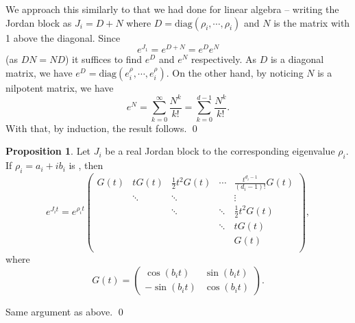 \documentclass[
]{article}
\theoremstyle{definition}
\newtheorem{prop}{Proposition}
\theoremstyle{definition}
\begin{document}
We approach this similarly to that we had done for linear algebra --
writing the Jordan block as \(J_i = D + N\) where
\(D = \text{diag}(\rho_i, \cdots, \rho_i)\) and \(N\) is the matrix with
1 above the diagonal. Since \[e^{J_1} = e^{D + N} = e^D e^N\] (as
\(DN = ND\)) it suffices to find \(e^D\) and \(e^N\) respectively. As
\(D\) is a diagonal matrix, we have
\(e^D = \text{diag}(e^\rho_i, \cdots, e^\rho_i)\). On the other hand, by
noticing \(N\) is a nilpotent matrix, we have
\[e^N = \sum_{k = 0}^\infty \frac{N^k}{k!} = \sum_{k = 0}^{d - 1} \frac{N^k}{k!}.\]
With that, by induction, the result follows. \qed

\begin{prop}
  Let \(J_i\) be a real Jordan block to the corresponding eigenvalue \(\rho_i\). If 
  \(\rho_i = a_i + ib_i\) is , then 
  \[e^{J_i t} = e^{\rho_i t} 
    \begin{pmatrix}
      G(t) & tG(t) & \frac{1}{2}t^2G(t) & \cdots & \frac{t^{d_i - 1}}{(d_i - 1)!}G(t)\\
        & \ddots & \ddots    & & \vdots\\
        &   & \ddots & \ddots & \frac{1}{2}t^2G(t)\\
        &   &   & \ddots & tG(t)\\
        &   &   &   & G(t)\\
    \end{pmatrix},\]
  where 
  \[G(t) = \begin{pmatrix}
    \cos(b_i t) & \sin(b_i t)\\ -\sin(b_i t) & \cos(b_i t)
  \end{pmatrix}.\]
\end{prop}
\proof

Same argument as above. \qed
\end{document}

